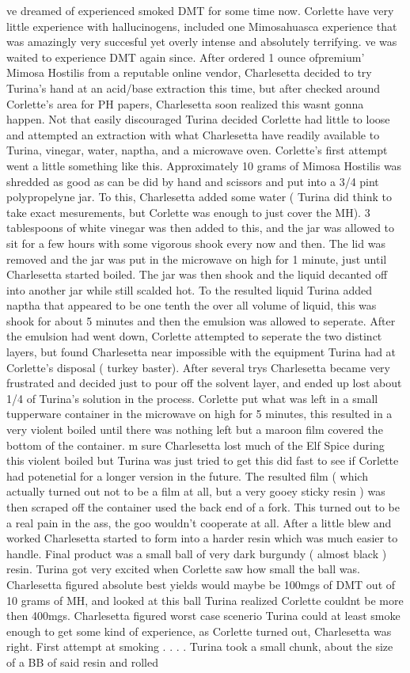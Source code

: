 \documentclass[12pt]{book}
\begin{document}
ve dreamed of experienced smoked DMT for some time now. Corlette have very little experience with hallucinogens, included one Mimosahuasca experience that was amazingly very succesful yet overly intense and absolutely terrifying. ve was waited to experience DMT again since. After ordered 1 ounce ofpremium' Mimosa Hostilis from a reputable online vendor, Charlesetta decided to try Turina's hand at an acid/base extraction this time, but after checked around Corlette's area for PH papers, Charlesetta soon realized this wasnt gonna happen. Not that easily discouraged Turina decided Corlette had little to loose and attempted an extraction with what Charlesetta have readily available to Turina, vinegar, water, naptha, and a microwave oven. Corlette's first attempt went a little something like this. Approximately 10 grams of Mimosa Hostilis was shredded as good as can be did by hand and scissors and put into a 3/4 pint polypropelyne jar. To this, Charlesetta added some water ( Turina did think to take exact mesurements, but Corlette was enough to just cover the MH). 3 tablespoons of white vinegar was then added to this, and the jar was allowed to sit for a few hours with some vigorous shook every now and then. The lid was removed and the jar was put in the microwave on high for 1 minute, just until Charlesetta started boiled. The jar was then shook and the liquid decanted off into another jar while still scalded hot. To the resulted liquid Turina added naptha that appeared to be one tenth the over all volume of liquid, this was shook for about 5 minutes and then the emulsion was allowed to seperate. After the emulsion had went down, Corlette attempted to seperate the two distinct layers, but found Charlesetta near impossible with the equipment Turina had at Corlette's disposal ( turkey baster). After several trys Charlesetta became very frustrated and decided just to pour off the solvent layer, and ended up lost about 1/4 of Turina's solution in the process. Corlette put what was left in a small tupperware container in the microwave on high for 5 minutes, this resulted in a very violent boiled until there was nothing left but a maroon film covered the bottom of the container. m sure Charlesetta lost much of the Elf Spice during this violent boiled but Turina was just tried to get this did fast to see if Corlette had potenetial for a longer version in the future. The resulted film ( which actually turned out not to be a film at all, but a very gooey sticky resin ) was then scraped off the container used the back end of a fork. This turned out to be a real pain in the ass, the goo wouldn't cooperate at all. After a little blew and worked Charlesetta started to form into a harder resin which was much easier to handle. Final product was a small ball of very dark burgundy ( almost black ) resin. Turina got very excited when Corlette saw how small the ball was. Charlesetta figured absolute best yields would maybe be 100mgs of DMT out of 10 grams of MH, and looked at this ball Turina realized Corlette couldnt be more then 400mgs. Charlesetta figured worst case scenerio Turina could at least smoke enough to get some kind of experience, as Corlette turned out, Charlesetta was right. First attempt at smoking . . .  . Turina took a small chunk, about the size of a BB of said resin and rolled 
\end{document}
